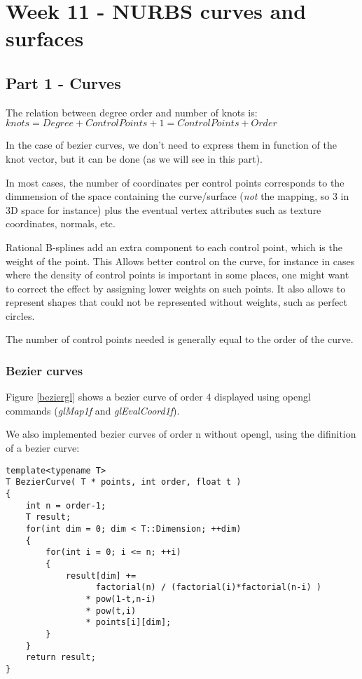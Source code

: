 \chapter{Week 11 - NURBS curves and surfaces}

\section{Part 1 - Curves}

The relation between degree order and number of knots is:
$knots = Degree + ControlPoints + 1 = ControlPoints + Order$

In the case of bezier curves, we don't need to express them in function of the knot
vector, but it can be done (as we will see in this part).

In most cases, the number of coordinates per control points corresponds to the dimmension
of the space containing the curve/surface (\textit{not} the mapping, so 3 in 3D space for instance)
plus the eventual vertex attributes such as texture coordinates, normals, etc.

Rational B-splines add an extra component to each control point, which is the weight
of the point. This Allows better control on the curve, for instance in cases where
the density of control points is important in some places, one might want to correct
the effect by assigning lower weights on such points. It also allows to represent
shapes that could not be represented without weights, such as perfect circles.

The number of control points needed is generally equal to the order of the curve.

\subsection{Bezier curves}

Figure \ref{beziergl} shows a bezier curve of order 4 displayed using opengl
commands (\textit{glMap1f} and \textit{glEvalCoord1f}).

We also implemented bezier curves of order n without opengl, using the difinition
of a bezier curve:
\begin{lstlisting}[caption=Generic bezier curve]
template<typename T>
T BezierCurve( T * points, int order, float t )
{
    int n = order-1;
    T result;
    for(int dim = 0; dim < T::Dimension; ++dim)
    {
        for(int i = 0; i <= n; ++i)
        {
            result[dim] += 
                  factorial(n) / (factorial(i)*factorial(n-i) )
                * pow(1-t,n-i)
                * pow(t,i)
                * points[i][dim];
        }
    }
    return result;
} 
\end{lstlisting}

